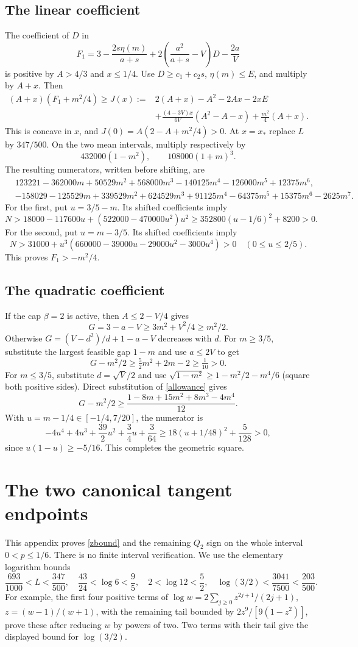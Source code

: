 \documentclass[11pt]{article}
\numberwithin{equation}{section}
\begin{document}
\subsection*{The linear coefficient}
The coefficient of $D$ in
\[
 F_1=3-\frac{2s\eta(m)}{a+s}
       +2\left(\frac{a^2}{a+s}-V\right)D-\frac{2a}{V}
\]
is positive by $A>4/3$ and $x\le1/4$. Use $D\ge c_1+c_2s$, $\eta(m)\le E$, and multiply by $A+x$. Then
\begin{align*}
 (A+x)(F_1+m^2/4)\ge J(x):={}&2(A+x)-A^2-2Ax-2xE\\
 &+\frac{(4-3V)x}{6V}(A^2-A-x)+\frac{m^2}{4}(A+x).
\end{align*}
This is concave in $x$, and $J(0)=A(2-A+m^2/4)>0$. At $x=x_*$ replace $L$ by $347/500$. On the two mean intervals, multiply respectively by
\[
 432000(1-m^2),\qquad 108000(1+m)^3.
\]
The resulting numerators, written before shifting, are
\begin{align*}
 &123221-362000m+50529m^2+568000m^3-140125m^4
 -126000m^5+12375m^6,\\
 &-158029-125529m+339529m^2+624529m^3+91125m^4
 -64375m^5+15375m^6-2625m^7.
\end{align*}
For the first, put $u=3/5-m$. Its shifted coefficients imply
\[
 N>18000-117600u+(522000-470000u^2)u^2
 \ge352800(u-1/6)^2+8200>0.
\]
For the second, put $u=m-3/5$. Its shifted coefficients imply
\[
 N>31000+u^3(660000-39000u-29000u^2-3000u^4)>0
 \quad(0\le u\le2/5).
\]
This proves $F_1>-m^2/4$.

\subsection*{The quadratic coefficient}
If the cap $\beta=2$ is active, then $A\le2-V/4$ gives
\[
 G=3-a-V\ge3m^2+V^2/4\ge m^2/2.
\]
Otherwise $G=(V-d^2)/d+1-a-V$ decreases with $d$. For $m\ge3/5$, substitute the largest feasible gap $1-m$ and use $a\le2V$ to get
\[
 G-m^2/2\ge\tfrac52m^2+2m-2\ge\tfrac1{10}>0.
\]
For $m\le3/5$, substitute $d=\sqrt V/2$ and use
$\sqrt{1-m^2}\ge1-m^2/2-m^4/6$ (square both positive sides). Direct substitution of \eqref{allowance} gives
\[
 G-m^2/2\ge\frac{1-8m+15m^2+8m^3-4m^4}{12}.
\]
With $u=m-1/4\in[-1/4,7/20]$, the numerator is
\[
 -4u^4+4u^3+\frac{39}{2}u^2+\frac34u+\frac3{64}
 \ge18(u+1/48)^2+\frac5{128}>0,
\]
since $u(1-u)\ge-5/16$. This completes the geometric square.

\section{The two canonical tangent endpoints}
This appendix proves \eqref{zbound} and the remaining $Q_2$ sign on the whole interval $0<p\le1/6$. There is no finite interval verification. We use the elementary logarithm bounds
\[
 \frac{693}{1000}<L<\frac{347}{500},\quad
 \frac{43}{24}<\log6<\frac95,\quad
 2<\log12<\frac52,\quad
 \log(3/2)<\frac{3041}{7500}<\frac{203}{500}.
\]
For example, the first four positive terms of
$\log w=2\sum_{j\ge0}z^{2j+1}/(2j+1)$, $z=(w-1)/(w+1)$, with the remaining tail bounded by $2z^9/[9(1-z^2)]$, prove these after reducing $w$ by powers of two. Two terms with their tail give the displayed bound for $\log(3/2)$.
\end{document}

